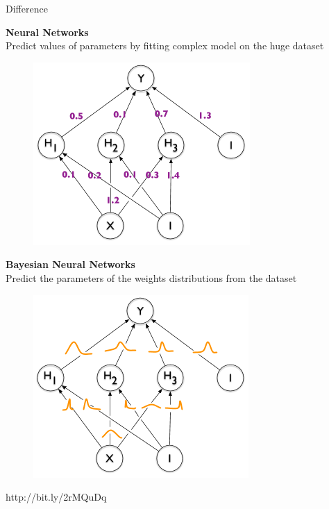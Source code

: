 \documentclass{beamer}
\begin{document}
\begin{frame}{Difference}	
	\begin{minipage}[t]{0.47\columnwidth}
		\textbf{Neural Networks} \\Predict values of parameters by fitting complex model on the huge dataset
		\begin{figure}
			\includegraphics[width=1\columnwidth]{pres_pics/BNN_1}
		\end{figure}
	\end{minipage}
	\hfill
	\begin{minipage}[t]{0.47\columnwidth}
		\textbf{Bayesian Neural Networks} \\Predict the parameters of the weights distributions from the dataset
		\vspace{0.07cm}
		\begin{figure}
			\includegraphics[width=1\columnwidth]{pres_pics/BNN_2}
		\end{figure}
	\end{minipage}
	\vfill
	\hrulefill
	
	\scriptsize{http://bit.ly/2rMQuDq}

\end{frame}
\end{document}
